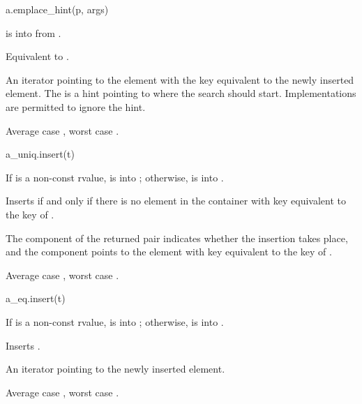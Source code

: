 %
\begin{itemdecl}
a.emplace_hint(p, args)
\end{itemdecl}

\begin{itemdescr}
\pnum
\result
{}

\pnum
\expects
{} is
 into  from .

\pnum
\effects
Equivalent to .

\pnum
\returns
An iterator pointing to the element
with the key equivalent to the newly inserted element.
The   is a hint
pointing to where the search should start.
Implementations are permitted to ignore the hint.

\pnum
\complexity
Average case , worst case .
\end{itemdescr}

%
\begin{itemdecl}
a_uniq.insert(t)
\end{itemdecl}

\begin{itemdescr}
\pnum
\result
{}

\pnum
\expects
If  is a non-const rvalue,
 is  into ;
otherwise,  is  into .

\pnum
\effects
Inserts  if and only if there is no element in the container
with key equivalent to the key of .

\pnum
\returns
The  component of the returned pair indicates
whether the insertion takes place, and
the  component points to
the element with key equivalent to the key of .

\pnum
\complexity
Average case , worst case .
\end{itemdescr}

%
\begin{itemdecl}
a_eq.insert(t)
\end{itemdecl}

\begin{itemdescr}
\pnum
\result
{}

\pnum
\expects
If  is a non-const rvalue,
 is  into ;
otherwise,  is  into .

\pnum
\effects
Inserts .

\pnum
\returns
An iterator pointing to the newly inserted element.

\pnum
\complexity
Average case , worst case .
\end{itemdescr}


